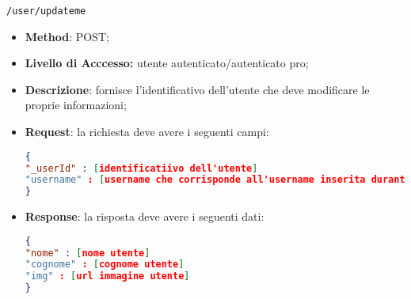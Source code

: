 	\item \texttt{/user/updateme}
		\begin{itemize}
			\item \textbf{Method}: POST;
			\item \textbf{Livello di Acccesso:} utente autenticato/autenticato pro;
			\item \textbf{Descrizione}: fornisce l'identificativo dell'utente che deve modificare le proprie informazioni;
			\item \textbf{Request}: la richiesta deve avere i seguenti campi:
\begin{lstlisting}[language=json,firstnumber=1]
{
"_userId" : [identificatiivo dell'utente]
"username" : [username che corrisponde all'username inserita durante la registrazione]
}
\end{lstlisting}
			\item \textbf{Response}: la risposta deve avere i seguenti dati:
\begin{lstlisting}[language=json,firstnumber=1]
{
"nome" : [nome utente]
"cognome" : [cognome utente]
"img" : [url immagine utente]
}
\end{lstlisting}
		\end{itemize}